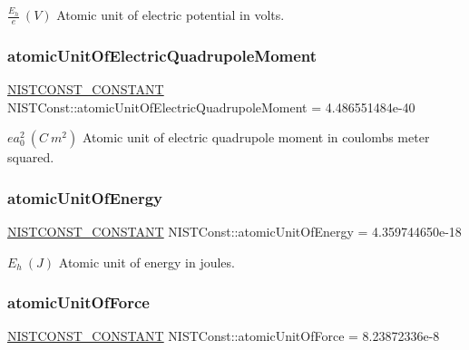 $ \frac{E_h}{e}\ (V)$ Atomic unit of electric potential in volts. \mbox{\label{group___n_i_s_t_const-_atomic_unit_ga4714cce6077b09c5fd2dbcb3efa95d5b}} 
\subsubsection{\texorpdfstring{atomic\+Unit\+Of\+Electric\+Quadrupole\+Moment}{atomicUnitOfElectricQuadrupoleMoment}}
{\footnotesize\ttfamily \mbox{\hyperlink{_n_i_s_t_const_8hpp_a2b0fc1d7452373f816175dd86ce26729}{N\+I\+S\+T\+C\+O\+N\+S\+T\+\_\+\+C\+O\+N\+S\+T\+A\+NT}} N\+I\+S\+T\+Const\+::atomic\+Unit\+Of\+Electric\+Quadrupole\+Moment = 4.\+486551484e-\/40}

$e a_0^2 \ (C\ m^2)$ Atomic unit of electric quadrupole moment in coulombs meter squared. \mbox{\label{group___n_i_s_t_const-_atomic_unit_gafa7ea08448d60570f5a6f2c6938bc8fc}} 
\subsubsection{\texorpdfstring{atomic\+Unit\+Of\+Energy}{atomicUnitOfEnergy}}
{\footnotesize\ttfamily \mbox{\hyperlink{_n_i_s_t_const_8hpp_a2b0fc1d7452373f816175dd86ce26729}{N\+I\+S\+T\+C\+O\+N\+S\+T\+\_\+\+C\+O\+N\+S\+T\+A\+NT}} N\+I\+S\+T\+Const\+::atomic\+Unit\+Of\+Energy = 4.\+359744650e-\/18}

$E_h \ (J)$ Atomic unit of energy in joules. \mbox{\label{group___n_i_s_t_const-_atomic_unit_gaf1da533cf2e7a57f1b0b87613ddea807}} 
\subsubsection{\texorpdfstring{atomic\+Unit\+Of\+Force}{atomicUnitOfForce}}
{\footnotesize\ttfamily \mbox{\hyperlink{_n_i_s_t_const_8hpp_a2b0fc1d7452373f816175dd86ce26729}{N\+I\+S\+T\+C\+O\+N\+S\+T\+\_\+\+C\+O\+N\+S\+T\+A\+NT}} N\+I\+S\+T\+Const\+::atomic\+Unit\+Of\+Force = 8.\+23872336e-\/8}

